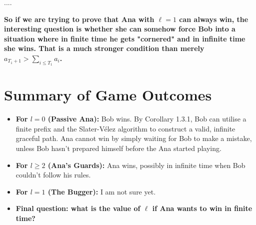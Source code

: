 ....

\textbf{So if we are trying to prove that Ana with \(\ell=1\) can always win, the interesting question is whether she can somehow force Bob into a situation where in finite time he gets "cornered" and in infinite time she wins. That is a much stronger condition than merely \(a_{T_1+1}>\sum_{i\leq T_1}a_i\).}

\section{Summary of Game Outcomes}


\begin{itemize}
    \item \textbf{For $l = 0$ (Passive Ana):} Bob wins. By Corollary 1.3.1, Bob can utilise a finite prefix and the Slater-Vélez algorithm to construct a valid, infinite graceful path. Ana cannot win by simply waiting for Bob to make a mistake, unless Bob hasn't prepared himself before the Ana started playing.
    \item \textbf{For $l \ge 2$ (Ana's Guards):} Ana wins, possibly in infinite time when Bob couldn't follow his rules.
    \item \textbf{For $l = 1$ (The Bugger):} I am not sure yet. 
    \item \textbf{Final question: what is the value of $\ell$ if Ana wants to win in finite time?}
\end{itemize}






